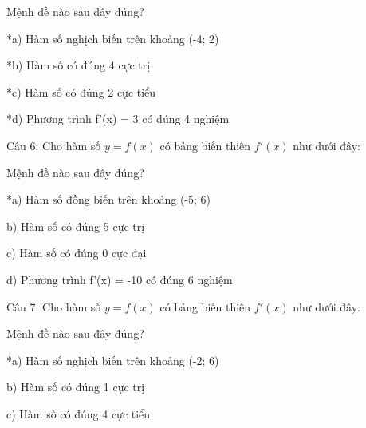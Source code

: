 \documentclass[a4paper,12pt]{article}
\begin{document}
Mệnh đề nào sau đây đúng?

*a) Hàm số nghịch biến trên khoảng (-4; 2)

*b) Hàm số có đúng 4 cực trị

*c) Hàm số có đúng 2 cực tiểu

*d) Phương trình f'(x) = 3 có đúng 4 nghiệm







Câu 6: Cho hàm số \(y=f(x)\) có bảng biến thiên \(f'(x)\) như dưới đây:


Mệnh đề nào sau đây đúng?

*a) Hàm số đồng biến trên khoảng (-5; 6)

b) Hàm số có đúng 5 cực trị

c) Hàm số có đúng 0 cực đại

d) Phương trình f'(x) = -10 có đúng 6 nghiệm







Câu 7: Cho hàm số \(y=f(x)\) có bảng biến thiên \(f'(x)\) như dưới đây:


Mệnh đề nào sau đây đúng?

*a) Hàm số nghịch biến trên khoảng (-2; 6)

b) Hàm số có đúng 1 cực trị

c) Hàm số có đúng 4 cực tiểu
\end{document}
